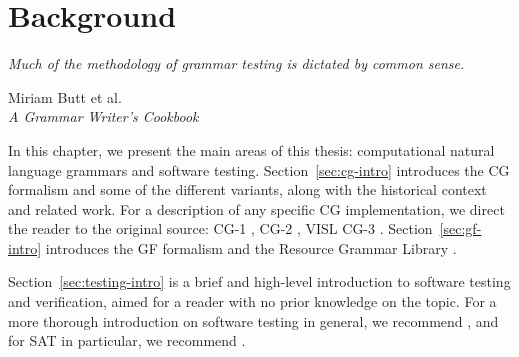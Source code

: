 \chapter{Background}

\epigraph{\it Much of the methodology of grammar testing is dictated by common sense.}{Miriam Butt et al.\\{\it A Grammar Writer's Cookbook}}

In this chapter, we present the main areas of this thesis: computational natural language grammars and software testing.
Section~\ref{sec:cg-intro} introduces the CG formalism and some of the different variants, along with the historical context and related work.
For a description of any specific CG implementation, we direct the reader to the original source: CG-1 \cite{karlsson1990cgp,karlsson1995constraint}, CG-2 \cite{tapanainen1996}, VISL CG-3 \cite{bick2015,vislcg3}.
Section~\ref{sec:gf-intro} introduces the GF formalism \cite{ranta2011gfbook} and the Resource Grammar Library \cite{ranta2009rgl}.

Section~\ref{sec:testing-intro} is a brief and high-level introduction to software testing and verification, aimed for a reader with no prior knowledge on the topic. For a more thorough introduction on software testing in general, we recommend \cite{ammann2016introduction}, and for SAT in particular, we recommend \cite{biere2009handbook}.










